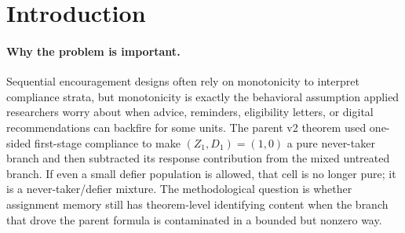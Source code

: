 \documentclass[11pt]{article}
\theoremstyle{definition}
\theoremstyle{plain}
\theoremstyle{remark}
\begin{document}
\begin{abstract}
The parent \texttt{pid\_dynamic\_iv\_compliance}/\texttt{v2} result shows that a remembered first-stage assignment can tighten dynamic IV bounds because one observed history is a pure never-taker branch.  This proposal asks whether the same memory mechanism survives when first-stage monotonicity fails but defier mass is bounded.  The flagship conjecture is that the sharp two-stage bound is the projection of a defier-trimmed response-contribution prism: the parent response-contribution subtraction is recovered at \(\kappa=0\), while positive \(\kappa\) opens an interval fan for the never-taker contribution.  A second conjecture states a phase transition: retained assignment memory gives strict endpoint gain below an observable defier-budget threshold and can lose all strict gain above it.  Resolving this would turn a fragile one-sided-compliance theorem into a sensitivity theorem for dynamic IV experiments whose monotonicity assumption is credible only approximately.
\end{abstract}

\section{Introduction}
\paragraph{Why the problem is important.}
Sequential encouragement designs often rely on monotonicity to interpret compliance strata, but monotonicity is exactly the behavioral assumption applied researchers worry about when advice, reminders, eligibility letters, or digital recommendations can backfire for some units.  The parent v2 theorem used one-sided first-stage compliance to make \((Z_1,D_1)=(1,0)\) a pure never-taker branch and then subtracted its response contribution from the mixed untreated branch.  If even a small defier population is allowed, that cell is no longer pure; it is a never-taker/defier mixture.  The methodological question is whether assignment memory still has theorem-level identifying content when the branch that drove the parent formula is contaminated in a bounded but nonzero way.
\end{document}

